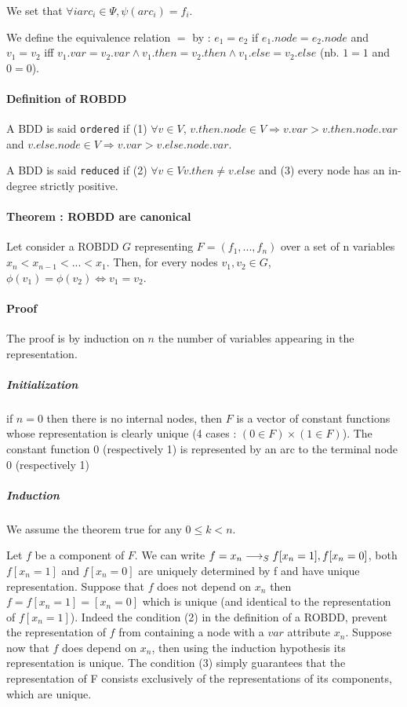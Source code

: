 \documentclass[a4paper,10pt]{article}
\begin{document}
We set that $\forall i arc_i \in \Psi, \psi(arc_i) = f_i$.

We define the equivalence relation $=$ by : $e_1 = e_2$ if $e_1.node = e_2.node$ and $v_1 = v_2$ iff $v_1.var = v_2.var \land v_1.then = v_2.then \land v_1.else = v_2.else$ (nb. $1=1$ and $0=0$).

\paragraph{Definition of ROBDD\\}
A BDD is said \texttt{ordered} if (1) $\forall v\in V$, $v.then.node \in V \Rightarrow v.var > v.then.node.var$ and $v.else.node \in V \Rightarrow v.var > v.else.node.var$.

A BDD is said \texttt{reduced} if (2) $\forall v\in V v.then \neq v.else$ and (3) every node has an in-degree strictly positive.

\paragraph{Theorem : ROBDD are canonical\\}

Let consider a ROBDD $G$ representing $F=(f_1, ..., f_n)$ over a set of n variables $x_n < x_{n-1} < ... < x_1$. Then, for every nodes $v_1, v_2 \in G$, $\phi(v_1) = \phi(v_2) \Leftrightarrow v_1 = v_2$.

\paragraph{Proof\\}
The proof is by induction on $n$ the number of variables appearing in the representation.
\subparagraph{Initialization\\}
if $n=0$ then there is no internal nodes, then $F$ is a vector of constant functions whose representation is clearly unique (4 cases : $(0\in F) \times (1\in F)$).
The constant function 0 (respectively 1) is represented by an arc to the terminal node 0 (respectively 1)
\subparagraph{Induction\\}
We assume the theorem true for any $0 \leq k < n$.

Let $f$ be a component of $F$. We can write $f = x_n \longrightarrow_S f[x_n=1], f[x_n=0]$, both $f[x_n=1]$ and $f[x_n=0]$ are uniquely determined by f and have unique representation.
Suppose that $f$ does not depend on $x_n$ then $f=f[x_n=1]=[x_n=0]$ which is unique (and identical to the representation of $f[x_n=1]$).
Indeed the condition (2) in the definition of a ROBDD, prevent the representation of $f$ from containing a node with a $var$ attribute $x_n$.
Suppose now that $f$ does depend on $x_n$, then using the induction hypothesis its representation is unique.
The condition (3) simply guarantees that the representation of F consists exclusively of the representations of its components, which are unique.
\end{document}
